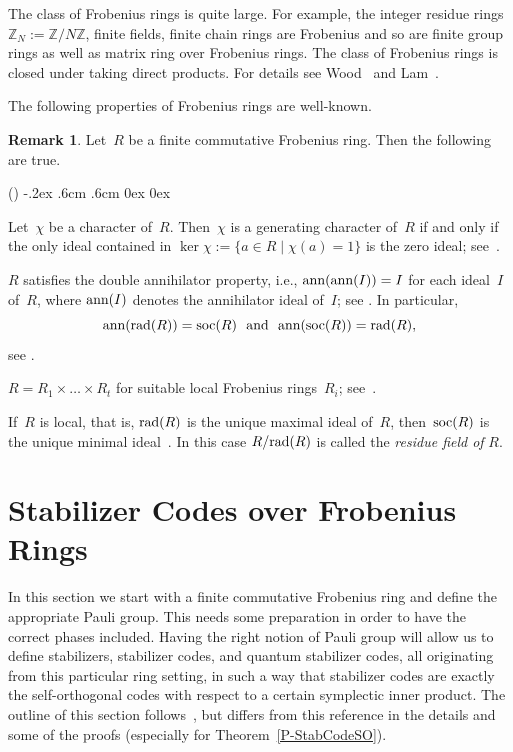 \documentclass[11pt]{article}
\theoremstyle{definition}
\newtheorem{rem}[theo]{Remark}
\numberwithin{equation}{section}
\newcommand{\Z}{{\mathbb Z}}
\newcommand{\ann}{\mbox{\rm ann}}
\newcommand{\soc}{\mbox{\rm soc}}
\newcommand{\rad}{\mbox{\rm rad}}
\newcounter{alp}
\newcounter{ara}
\newcounter{rom}
\newenvironment{alphalist}{\begin{list}{(\alph{alp})\hfill}{\usecounter{alp}
     \topsep-.2ex \labelwidth.6cm \leftmargin.6cm \labelsep0cm
     \rightmargin0cm \parsep0ex \itemsep0ex}}{\end{list}}
\begin{document}
The class of Frobenius rings is quite large.
For example, the integer residue rings~$\Z_N:=\Z/N\Z$, finite fields, finite chain rings are Frobenius and so are
finite group rings as well as matrix ring over Frobenius rings.
The class of Frobenius rings is closed under taking direct products.
For details see Wood~\cite[Ex.~4.4]{Wo99} and Lam~\cite[Sec.~16.B]{Lam99}.

The following properties of Frobenius rings are well-known.

\begin{rem}\label{R-FrobProp}
Let~$R$ be a finite commutative Frobenius ring. Then the following are true.
\begin{alphalist}
\item Let~$\chi$ be a character of~$R$.
      Then~$\chi$ is a generating character of~$R$ if and only if the only ideal contained in
      $\ker\chi:=\{a\in R\mid \chi(a)=1\}$ is the zero ideal; see~\cite[Cor.~3.6]{ClGo92}.
\item $R$ satisfies the double annihilator property, i.e.,
      $\ann(\ann(I))=I$ for each ideal~$I$ of~$R$,
      where $\ann(I)$ denotes the annihilator ideal of~$I$;
      see \cite[Th.~15.1]{Lam99}.
      In particular,
      \begin{equation}\label{e-ann}
         \ann(\rad(R))=\soc(R)\ \text{ and }\ \ann(\soc(R))=\rad(R),
      \end{equation}
      see \cite[Cor.~15.7]{Lam99}.
\item $R=R_1\times\ldots\times R_t$ for suitable local Frobenius rings~$R_i$; see~\cite[Th.~15.27]{Lam99}.
\item If~$R$ is local, that is, $\rad(R)$ is the unique maximal ideal of~$R$, then~$\soc(R)$ is the unique minimal
      ideal~\cite[Ex.~(3.14)]{Lam99}.
      In this case $R/\rad(R)$ is called the \emph{residue field of} $R$.
\end{alphalist}
\end{rem}

\section{Stabilizer Codes over Frobenius Rings}\label{SS-StabCode}
In this section we start with a finite commutative Frobenius ring and define the  appropriate Pauli group.
This needs some preparation in order to have the correct phases included.
Having the right notion of Pauli group will allow us to define stabilizers, stabilizer codes, and quantum stabilizer codes, all originating from this particular ring setting, in
such a way that stabilizer codes are exactly the self-orthogonal codes with respect to a certain symplectic inner product.
The outline of this section follows~\cite{NaKl12}, but differs from this reference in the details and some of the proofs (especially for Theorem~\ref{P-StabCodeSO}).
\end{document}
